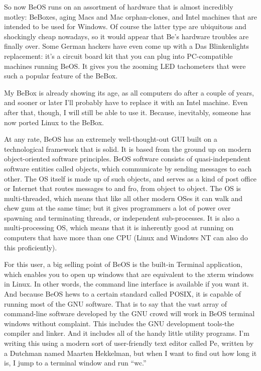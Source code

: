 \documentclass[
  fontsize=11pt,
  paper=landscape,
  twocolumn=true,
  pagesize=pdftex,
  headings=small,
  DIV=15,
  ]{scrartcl}
\begin{document}
So now BeOS runs on an assortment of hardware that is almost incredibly
motley: BeBoxes, aging Macs and Mac orphan-clones, and Intel machines
that are intended to be used for Windows. Of course the latter type are
ubiquitous and shockingly cheap nowadays, so it would appear that Be's
hardware troubles are finally over. Some German hackers have even come
up with a Das Blinkenlights replacement: it's a circuit board kit that
you can plug into PC-compatible machines running BeOS. It gives you the
zooming LED tachometers that were such a popular feature of the BeBox.

My BeBox is already showing its age, as all computers do after a couple
of years, and sooner or later I'll probably have to replace it with an
Intel machine. Even after that, though, I will still be able to use it.
Because, inevitably, someone has now ported Linux to the BeBox.

At any rate, BeOS has an extremely well-thought-out GUI built on a
technological framework that is solid. It is based from the ground up on
modern object-oriented software principles. BeOS software consists of
quasi-independent software entities called objects, which communicate by
sending messages to each other. The OS itself is made up of such
objects, and serves as a kind of post office or Internet that routes
messages to and fro, from object to object. The OS is multi-threaded,
which means that like all other modern OSes it can walk and chew gum at
the same time; but it gives programmers a lot of power over spawning and
terminating threads, or independent sub-processes. It is also a
multi-processing OS, which means that it is inherently good at running
on computers that have more than one CPU (Linux and Windows NT can also
do this proficiently).

For this user, a big selling point of BeOS is the built-in Terminal
application, which enables you to open up windows that are equivalent to
the xterm windows in Linux. In other words, the command line interface
is available if you want it. And because BeOS hews to a certain standard
called POSIX, it is capable of running most of the GNU software. That is
to say that the vast array of command-line software developed by the GNU
crowd will work in BeOS terminal windows without complaint. This
includes the GNU development tools-the compiler and linker. And it
includes all of the handy little utility programs. I'm writing this
using a modern sort of user-friendly text editor called Pe, written by a
Dutchman named Maarten Hekkelman, but when I want to find out how long
it is, I jump to a terminal window and run ``wc.''
\end{document}
